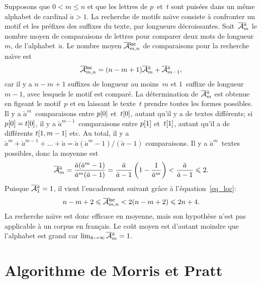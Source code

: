Supposons que \(0 < m \leqslant n\) et que les lettres de
\(p\)~et~\(t\) sont puisées dans un même alphabet de cardinal
\(\breve{a} > 1\). La recherche de motifs na\"{\i}ve consiste à
confronter un motif et les préfixes des suffixes du texte, par
longueurs décroissantes. Soit~\(\OM{\breve{a}}{m}\)
 le nombre moyen de comparaisons de
lettres pour comparer deux mots de longueur~\(m\), de
l'alphabet~\(\breve{a}\). Le nombre moyen \(\OM{\fun{loc}}{m,n}\) de
comparaisons pour la recherche na\"{\i}ve est
\begin{equation}
\OM{\fun{loc}}{m,n} = (n-m+1)\OM{\breve{a}}{m} + \OM{\breve{a}}{m-1},
\label{eq_loc}
\end{equation}
car il y a \(n-m+1\) suffixes de longueur au moins~\(m\) et
\(1\)~suffixe de longueur~\(m-1\), avec lesquels le motif est comparé.
La détermination de \(\OM{\breve{a}}{m}\) est obtenue en figeant le
motif~\(p\) et en laissant le texte~\(t\) prendre toutes les formes
possibles. Il y a \(\breve{a}^{m}\)~comparaisons entre \({p}[{0}]\)
et~\({t}[{0}]\), autant qu'il y a de textes différents; si
\({p}[{0}]={t}[{0}]\), il y a \(\breve{a}^{m-1}\)~comparaisons
entre \({p}[{1}]\) et~\({t}[{1}]\), autant qu'il a de différents
\({t}[{1,m-1}]\) etc. Au total, il y a \(\breve{a}^{m} +
\breve{a}^{m-1} + \dots + \breve{a} = \breve{a}(\breve{a}^{m} -
1)/(\breve{a}-1)\) comparaisons. Il y a \(\breve{a}^m\)~textes
possibles, donc la moyenne est
\begin{equation*}
\OM{\breve{a}}{m}
 = \frac{\breve{a}(\breve{a}^{m}-1)}{\breve{a}^m(\breve{a}-1)}
 = \frac{\breve{a}}{\breve{a}-1}\left(1
                          - \frac{1}{\breve{a}^{m}}\right)
 < \frac{\breve{a}}{\breve{a}-1}
 \leqslant 2.
\end{equation*}
Puisque \(\OM{\breve{a}}{1} = 1\), il vient l'encadrement suivant
grâce à l'équation~\eqref{eq_loc}:
\begin{equation*}
n - m + 2 \leqslant \OM{\fun{loc}}{m,n} < 2(n-m+2) \leqslant 2n + 4.
\end{equation*}
La recherche na\"{\i}ve est donc efficace en moyenne, mais son
hypothèse n'est pas applicable à un corpus en français. Le coût moyen
est d'autant moindre que l'alphabet est grand car \(\lim_{\breve{a}
  \rightarrow \infty}\OM{\breve{a}}{m} = 1\). 


\section{Algorithme de Morris et Pratt}

